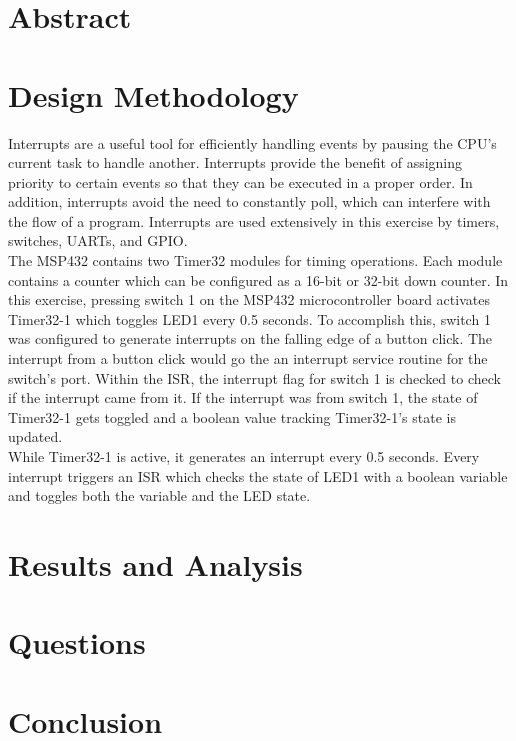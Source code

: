 \documentclass[CMPE]{KGCOEReport}
\begin{document}
\maketitle

\section*{Abstract}

\section*{Design Methodology}

Interrupts are a useful tool for efficiently handling events by pausing the CPU's current task to handle another. Interrupts provide the benefit of assigning priority to certain events so that they can be executed in a proper order. In addition, interrupts avoid the need to constantly poll, which can interfere with the flow of a program. Interrupts are used extensively in this exercise by timers, switches, UARTs, and GPIO.\\

The MSP432 contains two Timer32 modules for timing operations. Each module contains a counter which can be configured as a 16-bit or 32-bit down counter. In this exercise, pressing switch 1 on the MSP432 microcontroller board activates Timer32-1 which toggles LED1 every 0.5 seconds. To accomplish this, switch 1 was configured to generate interrupts on the falling edge of a button click. The interrupt from a button click would go the an interrupt service routine for the switch's port. Within the ISR, the interrupt flag for switch 1 is checked to check if the interrupt came from it. If the interrupt was from switch 1, the state of Timer32-1 gets toggled and a boolean value tracking Timer32-1's state is updated.\\

While Timer32-1 is active, it generates an interrupt every 0.5 seconds. Every interrupt triggers an ISR which checks the state of LED1 with a boolean variable and toggles both the variable and the LED state.\\

\section*{Results and Analysis}

\section*{Questions}

\section*{Conclusion}

\newpage
\begin{figure}[H]
    \centering
    \begin{adjustbox}{center}
    \end{adjustbox}
\end{figure}
\end{document}
